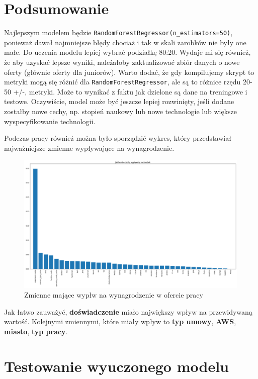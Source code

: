 \documentclass[a4paper]{article}
\begin{document}
\section{Podsumowanie}
\quad Najlepszym modelem będzie \texttt{RandomForestRegressor(n\_estimators=50)},
ponieważ dawał najmniejsze błędy chociaż i tak w skali zarobków nie były one małe.
Do uczenia modelu lepiej wybrać podziałkę 80:20. Wydaje mi się również, że aby uzyskać lepsze wyniki,
należałoby zaktualizować zbiór danych o nowe oferty (głównie oferty dla juniorów). Warto dodać, że
gdy kompilujemy skrypt to metryki mogą się różnić dla \texttt{RandomForestRegressor}, ale są to różnice rzędu 20-50 +/-, metryki. Może to wynikać z faktu jak dzielone są dane na treningowe i testowe.
Oczywiście, model może być jeszcze lepiej rozwinięty, jeśli dodane zostałby nowe cechy, np. stopień naukowy lub nowe technologie lub większe wyspecyfikowanie technologii.

\quad Podczas pracy również można było sporządzić wykres, który przedstawiał najważniejsze zmienne wypływające na wynagrodzenie.

\begin{figure}[H]
    \centering
    \includegraphics[width=\textwidth]{../analysis/plots/wyniki/importance_of_vars.png}
    \caption{Zmienne mające wypłw na wynagrodzenie w ofercie pracy}
\end{figure}

\quad Jak łatwo zauważyć, \textbf{doświadczenie} miało największy wpływ na przewidywaną wartość.
Kolejnymi zmiennymi, które miały wpływ to \textbf{typ umowy}, \textbf{AWS}, \textbf{miasto}, \textbf{typ pracy}.

\newpage

\section{Testowanie wyuczonego modelu}
\end{document}
